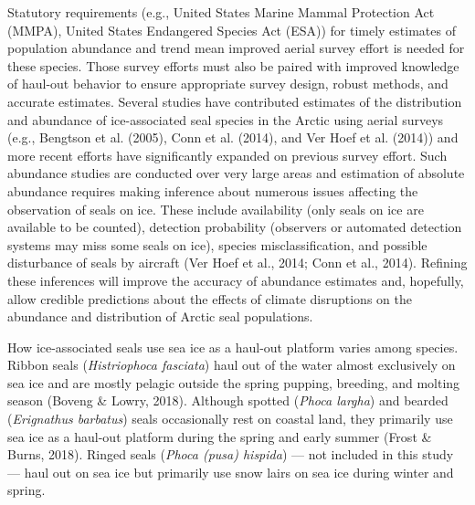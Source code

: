 \documentclass[fleqn,10pt,lineno]{wlpeerj} %
\begin{document}
Statutory requirements (e.g., United States Marine Mammal Protection Act (MMPA),
United States Endangered Species Act (ESA)) for timely estimates of population
abundance and trend mean improved aerial survey effort is needed for these
species. Those survey efforts must also be paired with improved knowledge of
haul-out behavior to ensure appropriate survey design, robust methods, and
accurate estimates. Several studies have contributed estimates of the
distribution and abundance of ice-associated seal species in the Arctic using
aerial surveys (e.g.,
Bengtson et al. (2005), Conn et al. (2014), and Ver Hoef et al. (2014)) and more recent efforts have
significantly expanded on previous survey effort. Such abundance studies are
conducted over very large areas and estimation of absolute abundance requires
making inference about numerous issues affecting the observation of seals on
ice. These include availability (only seals on ice are available to be counted),
detection probability (observers or automated detection systems may miss some
seals on ice), species misclassification, and possible disturbance of seals by
aircraft (Ver Hoef et al., 2014; Conn et al., 2014). Refining these inferences will improve the
accuracy of abundance estimates and, hopefully, allow credible predictions about
the effects of climate disruptions on the abundance and distribution of Arctic
seal populations.

How ice-associated seals use sea ice as a haul-out platform varies among
species. Ribbon seals (\emph{Histriophoca fasciata}) haul out of the water almost
exclusively on sea ice and are mostly pelagic outside the spring pupping,
breeding, and molting season (Boveng \& Lowry, 2018). Although spotted (\emph{Phoca largha})
and bearded (\emph{Erignathus barbatus}) seals occasionally rest on coastal land,
they primarily use sea ice as a haul-out platform during the spring and early
summer (Frost \& Burns, 2018). Ringed seals (\emph{Phoca (pusa) hispida}) --- not included in this
study --- haul out on sea ice but primarily use snow lairs on sea ice during
winter and spring.
\end{document}
